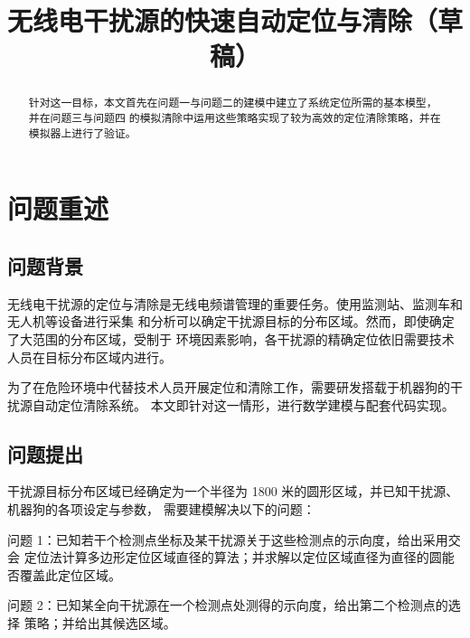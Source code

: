 \documentclass[withoutpreface,bwprint]{cumcmthesis}
\title{无线电干扰源的快速自动定位与清除（草稿）}
\begin{document}
\maketitle

\begin{abstract}


针对这一目标，本文首先在问题一与问题二的建模中建立了系统定位所需的基本模型，并在问题三与问题四
的模拟清除中运用这些策略实现了较为高效的定位清除策略，并在模拟器上进行了验证。

\end{abstract}


\section{问题重述}
\subsection{问题背景}
无线电干扰源的定位与清除是无线电频谱管理的重要任务。使用监测站、监测车和无人机等设备进行采集
和分析可以确定干扰源目标的分布区域。然而，即使确定了大范围的分布区域，受制于
环境因素影响，各干扰源的精确定位依旧需要技术人员在目标分布区域内进行。

为了在危险环境中代替技术人员开展定位和清除工作，需要研发搭载于机器狗的干扰源自动定位清除系统。
本文即针对这一情形，进行数学建模与配套代码实现。

\subsection{问题提出}
干扰源目标分布区域已经确定为一个半径为 1800 米的圆形区域，并已知干扰源、机器狗的各项设定与参数，
需要建模解决以下的问题：

问题 1：已知若干个检测点坐标及某干扰源关于这些检测点的示向度，给出采用交会
定位法计算多边形定位区域直径的算法；并求解以定位区域直径为直径的圆能否覆盖此定位区域。

问题 2：已知某全向干扰源在一个检测点处测得的示向度，给出第二个检测点的选择
策略；并给出其候选区域。
\end{document}
